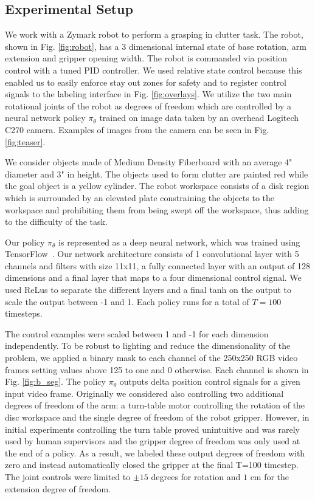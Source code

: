\documentclass[10pt, conference]{ieeeconf}      %
\begin{document}
\subsection{Experimental Setup}
We work with a Zymark robot to perform a grasping in clutter task. The robot, shown in Fig. \ref{fig:robot}, has a 3
dimensional internal state of base rotation, arm extension and gripper opening width. The robot is commanded via position 
control with a tuned PID controller. We used
relative state control because this enabled us to easily enforce stay out zones for safety
and to register control signals to the labeling interface in Fig. \ref{fig:overlays}. We utilize the two main rotational joints of the
robot as degrees of freedom which are controlled by a neural network policy $\pi_{\theta}$ trained on image data taken by
an overhead Logitech C270 camera. Examples of images from the camera can be seen in Fig. \ref{fig:teaser}.

We consider objects made of Medium Density Fiberboard with an average 4" diameter and 3" in height. The objects used to form clutter are
painted red while the goal object is a yellow cylinder. The robot workspace consists of a disk region which is
surrounded by an elevated plate constraining the objects to the workspace and prohibiting them from being swept off
the workspace, thus adding to the difficulty of the task.

Our policy $\pi_{\theta}$ is represented as a deep neural network, which was trained using
TensorFlow~\cite{tensorflow2015-whitepaper}. Our network architecture consists of 1 convolutional layer with 5 channels
and filters with size 11x11, a fully connected layer with an output of 128 dimensions and a final layer that maps to a
four dimensional control signal. We used ReLus to separate the different layers and a final tanh on the output to scale
the output between -1 and 1. Each policy runs for a total of $T=100$ timesteps.

The control examples were scaled between 1 and -1 for each dimension independently. To be robust to lighting and reduce
the dimensionality of the problem, we applied a binary mask to each channel of the 250x250 RGB video frames setting
values above 125 to one and 0 otherwise. Each channel is shown in Fig. \ref{fig:b_seg}.
The policy $\pi_\theta$ outputs delta position control signals for a given input video frame.
Originally we considered also controlling two additional degrees of freedom of the arm: a turn-table motor controlling
the rotation of the disc workspace and the single degree of freedom of the robot gripper. However, in initial
experiments controlling the turn table proved unintuitive and was rarely used by human supervisors and the gripper degree of freedom was only used at the end of a policy. As a result, we labeled these output degrees of freedom with zero and instead automatically closed the gripper
at the final T=100 timestep. The joint controls were limited to $\pm 15$ degrees for rotation and $1$ cm for the
extension degree of freedom.
\end{document}
